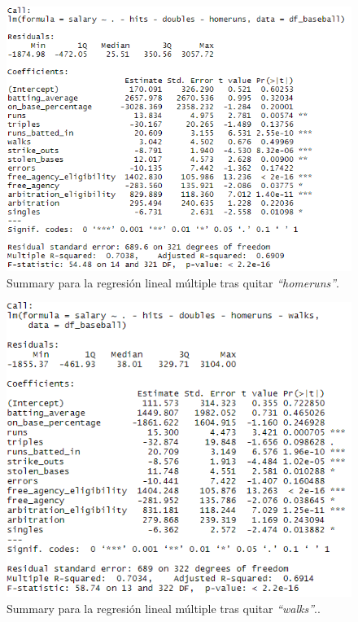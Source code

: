 \documentclass[a4paper,12pt, oneside]{book}
\begin{document}
\begin{figure}[H]
\centering
\includegraphics[scale=0.7]{images/multifit4.PNG}
\caption{Summary para la regresión lineal múltiple tras quitar \textit{``homeruns''}.}
\end{figure}

\begin{figure}[H]
\centering
\includegraphics[scale=0.7]{images/multifit5.PNG}
\caption{Summary para la regresión lineal múltiple tras quitar \textit{``walks''}..}
\end{figure}
\end{document}
